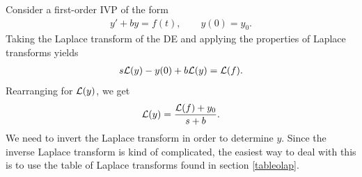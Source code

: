 \documentclass{book}
\begin{document}
Consider a first-order IVP of the form
\begin{align*}
y' + by = f(t), \qquad y(0)=y_0.
\end{align*}
Taking the Laplace transform of the DE and applying the properties of Laplace
transforms yields
\begin{align*}
s\mathcal{L} (y) - y(0) + b \mathcal{L}(y) = \mathcal{L}(f).
\end{align*}
Rearranging for $\mathcal{L}(y)$, we get
\begin{align*}
\mathcal{L}(y) =\frac{\mathcal{L}(f) + y_0}{s+b}.
\end{align*}
We need to invert the Laplace transform in order to determine $y$.
Since the inverse Laplace transform is kind of complicated, the easiest
way to deal with this is to use the table of Laplace transforms found in
section \ref{tableolap}.
\end{document}
